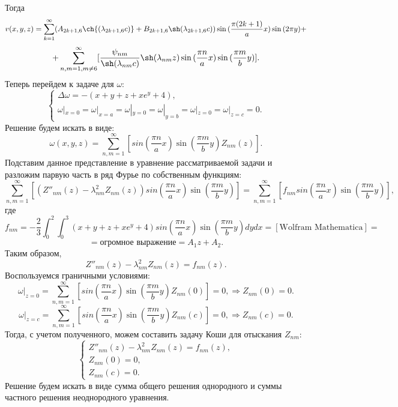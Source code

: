 \documentclass[11pt]{article}
\begin{document}
Тогда $$v(x,y,z)=\sum_{k=1}^\infty (A_{2k+1,6}\ch{(\lambda_{2k+1,6}c)}+B_{2k+1,6}\sh(\lambda_{2k+1,6}c))\sin{(\frac{\pi (2k+1)}{a} x)}\sin{(2\pi y)}+$$
$$+\sum_{n,m=1, m \neq 6}^\infty[ \frac{\psi_{nm}}{\sh(\lambda_{nm}c)}\sh(\lambda_{nm}z)\sin{(\frac{\pi n}{a}x)}\sin{(\frac{\pi m}{b}y)}].$$
Теперь перейдем к задаче для $\omega$:
$$\begin{cases}
    \Delta \omega=-(x+y+z+xe^y+4),\\
     \omega|_{x=0}=\omega|_{x=a}=\omega|_{y=0}=\omega|_{y=b}=\omega|_{z=0}=\omega|_{z=c}=0.
\end{cases}$$
Решение будем искать в виде:
$$\omega(x,y,z)=\sum_{n,m=1}^\infty  [sin{(\frac{\pi n}{a}x)}\sin{(\frac{\pi m}{b}y)}Z_{nm}(z)].$$
Подставим данное представление в уравнение рассматриваемой задачи и разложим парвую часть в ряд Фурье по собственным функциям:
$$\sum_{n,m=1}^\infty  [(Z''_{nm}(z)-\lambda^2_{nm}Z_{nm}(z))sin{(\frac{\pi n}{a}x)}\sin{(\frac{\pi m}{b}y)}]=\sum_{n,m=1}^\infty [f_{nm}sin{(\frac{\pi n}{a}x)}\sin{(\frac{\pi m}{b}y)}],$$
где $$f_{nm}=-\dfrac23\int_0^2\int_0^3(x+y+z+xe^y+4)sin{(\frac{\pi n}{a}x)}\sin{(\frac{\pi m}{b}y)}dydx=[\text{Wolfram Mathematica}]=$$
$$=\text{огромное выражение}=A_1z+A_2.$$
Таким образом,
$$Z''_{nm}(z)-\lambda^2_{nm}Z_{nm}(z)=f_{nm}(z).$$
Воспользуемся граничными условиями:
$$\omega|_{z=0}=\sum_{n,m=1}^\infty  [sin{(\frac{\pi n}{a}x)}\sin{(\frac{\pi m}{b}y)}Z_{nm}(0)]=0, \Rightarrow Z_{nm}(0)=0.$$
$$\omega|_{z=c}=\sum_{n,m=1}^\infty  [sin{(\frac{\pi n}{a}x)}\sin{(\frac{\pi m}{b}y)}Z_{nm}(c)]=0, \Rightarrow Z_{nm}(c)=0.$$
Тогда, с учетом полученного, можем составить задачу Коши для отыскания $Z_{nm}:$
$$\begin{cases}
    Z''_{nm}(z)-\lambda^2_{nm}Z_{nm}(z)=f_{nm}(z),\\
    Z_{nm}(0)=0,\\
    Z_{nm}(c)=0.
\end{cases}$$
Решение будем искать в виде сумма общего решения однородного и суммы частного решения неоднородного уравнения.
\end{document}
